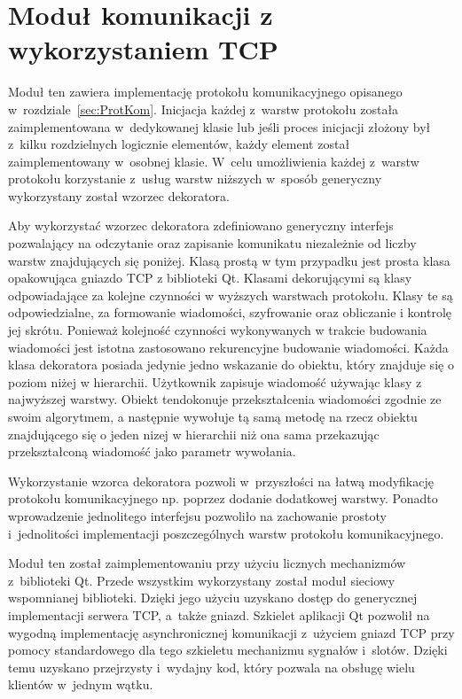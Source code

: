 \section[Moduł TCP][Moduł komunikacji z wykorzystaniem TCP]{Moduł komunikacji z wykorzystaniem TCP}

Moduł ten zawiera implementację protokołu komunikacyjnego opisanego
w~rozdziale~\ref{sec:ProtKom}. Inicjacja każdej z~warstw protokołu
została zaimplementowana w~dedykowanej klasie lub jeśli proces
inicjacji złożony był z~kilku rozdzielnych logicznie elementów, każdy
element został zaimplementowany w~osobnej klasie. W~celu umożliwienia
każdej z~warstw protokołu korzystanie z~usług warstw niższych w~sposób
generyczny wykorzystany został wzorzec dekoratora.

Aby wykorzystać wzorzec dekoratora zdefiniowano generyczny interfejs
pozwalający na odczytanie oraz zapisanie komunikatu niezależnie od
liczby warstw znajdujących się poniżej. Klasą prostą w tym przypadku
jest prosta klasa opakowująca gniazdo TCP z biblioteki Qt. Klasami
dekorującymi są klasy odpowiadające za kolejne czynności w wyższych
warstwach protokołu. Klasy te są odpowiedzialne, za formowanie
wiadomości, szyfrowanie oraz obliczanie i kontrolę jej
skrótu. Ponieważ kolejność czynności wykonywanych w trakcie budowania
wiadomości jest istotna zastosowano rekurencyjne budowanie
wiadomości. Każda klasa dekoratora posiada jedynie jedno wskazanie do
obiektu, który znajduje się o poziom niżej w hierarchii. Użytkownik
zapisuje wiadomość używając klasy z najwyższej warstwy. Obiekt
tendokonuje przekształcenia wiadomości zgodnie ze swoim algorytmem, a
następnie wywołuje tą samą metodę na rzecz obiektu znajdującego się o
jeden nizej w hierarchii niż ona sama przekazując przekształconą
wiadomość jako parametr wywołania.


Wykorzystanie wzorca dekoratora pozwoli w~przyszłości na łatwą
modyfikację protokołu komunikacyjnego np. poprzez dodanie dodatkowej
warstwy. Ponadto wprowadzenie jednolitego interfejsu pozwoliło na
zachowanie prostoty i~jednolitości implementacji poszczególnych warstw
protokołu komunikacyjnego.

Moduł ten został zaimplementowaniu przy użyciu licznych mechanizmów
z~biblioteki Qt. Przede wszystkim wykorzystany został moduł sieciowy
wspomnianej biblioteki. Dzięki jego użyciu uzyskano dostęp do
generycznej implementacji serwera TCP, a~także gniazd. Szkielet
aplikacji Qt pozwolił na wygodną implementację asynchronicznej
komunikacji z~użyciem gniazd TCP przy pomocy standardowego dla tego
szkieletu mechanizmu sygnałów i~slotów. Dzięki temu uzyskano
przejrzysty i~wydajny kod, który pozwala na obsługę wielu klientów
w~jednym wątku.

